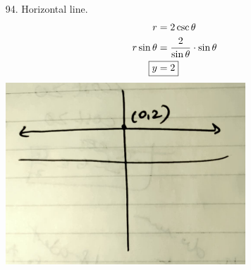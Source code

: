 \documentclass{article}
\begin{document}
\begin{multicols*}{2}
\begin{itemize}
	\vfill\null\columnbreak
	\item[94.]
		Horizontal line.
		\begin{align*}
			r&=2\csc\theta \\
			r\sin\theta&=\frac{2}{\sin\theta}\cdot\sin\theta \\
			\Aboxed{y&=2}
		\end{align*}
		\includegraphics*[width=\linewidth]{94.png}
	\end{itemize}
\end{multicols*}
\end{document}
